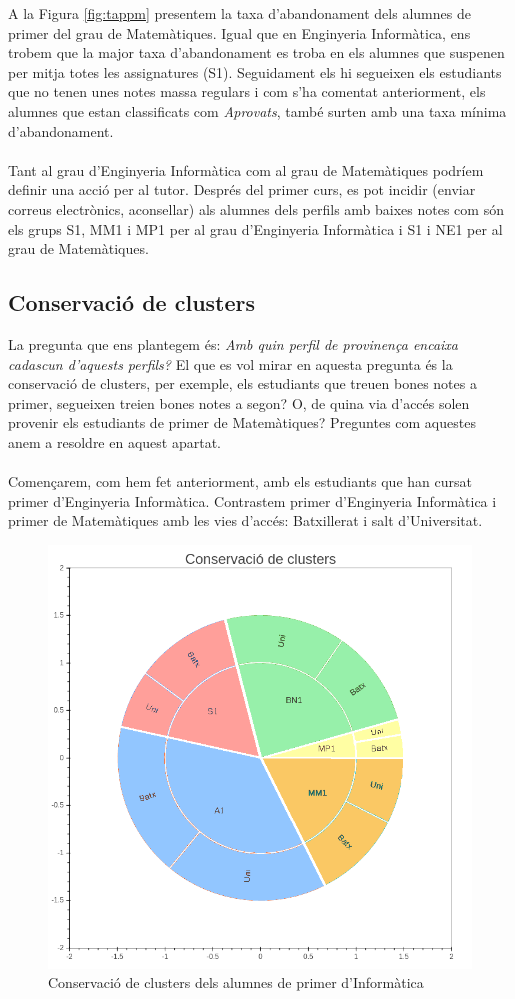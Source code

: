 \documentclass[12pt,a4paper,catalan]{article}
\begin{document}
A la Figura \ref{fig:tappm} presentem la taxa d'abandonament dels alumnes de primer del grau de Matemàtiques. Igual que en Enginyeria Informàtica, ens trobem que la major taxa d'abandonament es troba en els alumnes que suspenen per mitja totes les assignatures (S1). Seguidament els hi segueixen els estudiants que no tenen unes notes massa regulars i com s'ha comentat anteriorment, els alumnes que estan classificats com \textit{Aprovats}, també surten amb una taxa mínima d'abandonament.
\\
\\
Tant al grau d'Enginyeria Informàtica com al grau de Matemàtiques podríem definir una acció per al tutor. Després del primer curs, es pot incidir (enviar correus electrònics, aconsellar) als alumnes dels perfils amb baixes notes com són els grups S1, MM1 i MP1 per al grau d'Enginyeria Informàtica i S1 i NE1 per al grau de Matemàtiques.

\newpage

\subsection{Conservació de clusters}
\label{subsec:conservacioclusters}
La pregunta que ens plantegem és: \textit{Amb quin perfil de provinença encaixa cadascun d'aquests perfils?} El que es vol mirar en aquesta pregunta és la conservació de clusters, per exemple, els estudiants que treuen bones notes a primer, segueixen treien bones notes a segon? O, de quina via d'accés solen provenir els estudiants de primer de Matemàtiques? Preguntes com aquestes anem a resoldre en aquest apartat. 
\\
\\
Començarem, com hem fet anteriorment, amb els estudiants que han cursat primer d'Enginyeria Informàtica. Contrastem primer d'Enginyeria Informàtica i primer de Matemàtiques amb les vies d'accés: Batxillerat i salt d'Universitat.

\begin{figure}[h]
\centering
\includegraphics[width=.6\linewidth]{img/conservacio_clusters_primer_info.png}
\caption{Conservació de clusters dels alumnes de primer d'Informàtica}
\label{fig:ccei1}
\end{figure}
\end{document}
